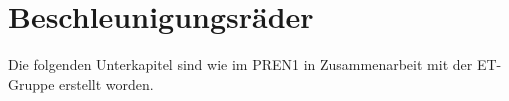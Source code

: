 \section{Beschleunigungsräder}

Die folgenden Unterkapitel sind wie im PREN1 in Zusammenarbeit mit der ET-Gruppe erstellt worden.

